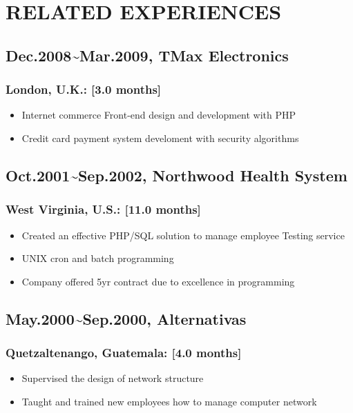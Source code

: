 \documentclass[12pt,a4paper]{article}
\begin{document}
\section{RELATED EXPERIENCES}
\subsection{Dec.2008{\textasciitilde}Mar.2009, TMax Electronics}
\subsubsection{London, U.K.: [3.0 months]}
\begin{itemize}
\item Internet commerce Front-end design and development with PHP


\item Credit card payment system develoment with security algorithms

\end{itemize}
\subsection{Oct.2001{\textasciitilde}Sep.2002, Northwood Health System}
\subsubsection{West Virginia, U.S.: [11.0 months]}
\begin{itemize}
\item Created an effective PHP/SQL solution to manage employee Testing service


\item UNIX cron and batch programming


\item Company offered 5yr contract due to excellence in programming

\end{itemize}
\subsection{May.2000{\textasciitilde}Sep.2000, Alternativas}
\subsubsection{Quetzaltenango, Guatemala: [4.0 months]}
\begin{itemize}
\item Supervised the design of network structure


\item Taught and trained new employees how to manage computer network

\end{itemize}
\end{document}
